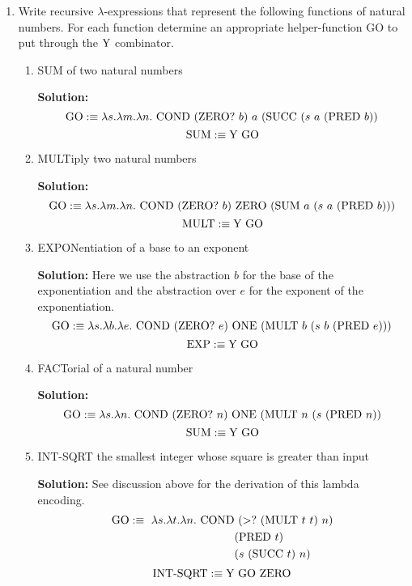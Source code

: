 \documentclass[11pt]{report}
\begin{document}
\begin{enumerate}
	
	\item Write recursive $\lambda$-expressions that represent the following functions of natural numbers. For each function determine an appropriate helper-function GO to put through the $\text{Y}$ combinator. 
	
		\begin{enumerate}
			\item SUM of two natural numbers
			
			{\bf Solution:}
			$$\GO :\equiv \lambda s. \lambda m. \lambda n. \ \COND \ (\ISITZERO \ b) \ a \ (\SUCC \ (s \ a \ (\PRED \ b)) $$
			$$\text{SUM} :\equiv \text{Y} \ \text{GO}$$

			\item MULTiply two natural numbers
			
			{\bf Solution:}
			$$\GO :\equiv \lambda s. \lambda m. \lambda n. \ \COND \ (\ISITZERO \ b) \ \ZERO \ (\SUM \ a \ (s \ a \ (\PRED \ b))) $$
			$$\MULT :\equiv \YCOMB \ \GO$$

			\item EXPONentiation of a base to an exponent
			
			{\bf Solution:}
			Here we use the abstraction $b$ for the base of the exponentiation and the abstraction over $e$ for the exponent of the exponentiation.
			$$\GO :\equiv \lambda s. \lambda b. \lambda e. \ \COND \ (\ISITZERO \ e) \ \ONE \ (\MULT \ b \ (s \ b \ (\PRED \ e))) $$
			$$\text{EXP} :\equiv \text{Y} \ \text{GO}$$

			\item FACTorial of a natural number
			
			{\bf Solution:}
			$$\GO :\equiv \lambda s. \lambda n. \ \COND \ (\ISITZERO \ n) \ \ONE \ (\MULT \ n \ (s \ (\PRED \ n)) $$
			$$\text{SUM} :\equiv \text{Y} \ \text{GO}$$
			
			\item INT-SQRT the smallest integer whose square is greater than input
			
			{\bf Solution:} See discussion above for the derivation of this lambda encoding. 	
			\begin{align*}
				\text{GO}:\equiv \  \lambda s. \lambda t. \lambda n. \ \text{COND} &\ (>? \ (\text{MULT} \ t \ t) \ n) \\
				&(\text{PRED} \ t) \\
				&(s \ (\text{SUCC} \ t) \ n)
			\end{align*}
			$$\text{INT-SQRT} :\equiv \text{Y} \ \text{GO} \ \text{ZERO}$$


\end{enumerate}
\end{enumerate}
\end{document}
